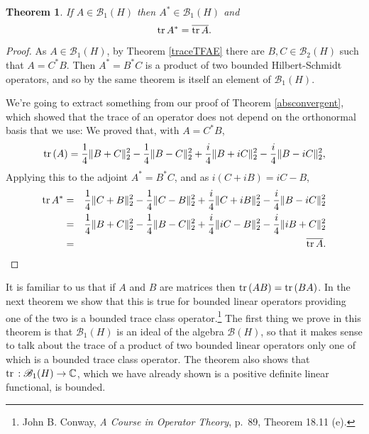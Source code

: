 \documentclass{article}
\newcommand{\tr}{\ensuremath\mathrm{tr}\,}
\newcommand{\norm}[1]{\Vert #1 \Vert}
\newtheorem{theorem}{Theorem}
\begin{document}
\begin{theorem}
If $A \in \mathscr{B}_1(H)$ then $A^* \in \mathscr{B}_1(H)$ and 
\[
\tr A^* = \overline{\tr A}.
\]
\label{traceadjoint}
\end{theorem}
\begin{proof}
As $A \in \mathscr{B}_1(H)$, by Theorem \ref{traceTFAE}  there are
$B,C \in \mathscr{B}_2(H)$ such that $A=C^*B$. Then $A^*=B^*C$ is
 a product of two bounded Hilbert-Schmidt operators, and so by the same theorem is itself an element of $\mathscr{B}_1(H)$.

We're going to extract something from our proof of Theorem \ref{absconvergent}, which showed that the trace of an
operator does not depend on the orthonormal basis that we use:
We proved that, with $A=C^*B$,
\[
\tr(A)= \frac{1}{4} \norm{B+C}_2^2 - \frac{1}{4} \norm{B-C}_2^2 + \frac{i}{4} \norm{B+iC}_2^2
 -  \frac{i}{4} \norm{B-iC}_2^2,
\]
Applying this to the adjoint $A^*=B^*C$, and as $i(C+iB)=iC-B$,
\begin{eqnarray*}
\tr A^*&=& \frac{1}{4} \norm{C+B}_2^2 - \frac{1}{4} \norm{C-B}_2^2 + \frac{i}{4} \norm{C+iB}_2^2
 -  \frac{i}{4} \norm{B-iC}_2^2\\
 &=&\frac{1}{4} \norm{B+C}_2^2 - \frac{1}{4} \norm{B-C}_2^2 + \frac{i}{4} \norm{iC-B}_2^2
 -  \frac{i}{4} \norm{iB+C}_2^2\\
 &=&\overline{\tr A}.
\end{eqnarray*}
\end{proof}



It is familiar to us that if $A$ and $B$ are matrices then $\tr(AB)=\tr(BA)$. In the next theorem we show that this is true for bounded linear operators providing one
of the two is a bounded
trace class operator.\footnote{John
B. Conway, {\em A Course in Operator Theory}, p.~89, Theorem 18.11 (e).} The first thing we prove in this theorem is that $\mathscr{B}_1(H)$ is an ideal of the
algebra $\mathscr{B}(H)$, so that it makes sense to talk about the trace of a product of two bounded linear operators only one of which is a bounded
trace class operator. The theorem also shows that $\tr:\mathscr{B}_1(H) \to \mathbb{C}$, which we have already shown is a positive definite linear functional, is bounded.
\end{document}
